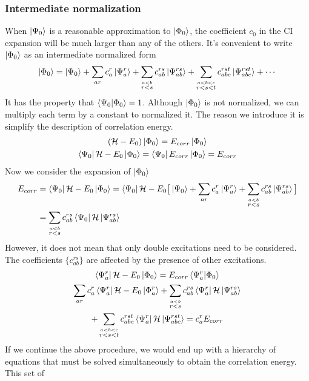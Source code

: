 \documentclass[11pt]{article}
\begin{document}
\subsubsection{Intermediate normalization}
When $\ket{\Psi_0}$ is a reasonable approximation to $\ket{\Phi_0}$, the coefficient $c_0$ in the CI expansion will be much larger than any of
the others. It's convenient to write $\ket{\Phi_0}$ as an intermediate normalized form
\begin{equation}
    \ket{\Phi_0}=\ket{\Psi_0}+\sum_{ar}c_a^r\ket{\Psi_a^r}+\sum_{\stackrel{a<b}{r<s}}c_{ab}^{rs}\ket{\Psi_{ab}^{rs}}+\sum_{\stackrel{a<b<c}{r<s<t}}c_{abc}^{rst}\ket{\Psi_{abc}^{rst}}+\cdots
\end{equation}
It has the property that $\braket{\Psi_0|\Phi_0}=1$. Although $\ket{\Phi_0}$ is not normalized, we can multiply each term by a constant to normalized it. The reason we introduce it is simplify
the description of correlation energy.
\begin{gather}
    (\mathcal{H}-E_0)\ket{\Phi_0}=E_{corr}\ket{\Phi_0} \notag\\
    \bra{\Psi_0}\mathcal{H}-E_0\ket{\Phi_0}=\bra{\Psi_0}E_{corr}\ket{\Phi_0}=E_{corr}
\end{gather}
Now we consider the expansion of $\ket{\Phi_0}$
\begin{equation}
    \begin{split}
        E_{corr}&=\bra{\Psi_0}\mathcal{H}-E_0\ket{\Phi_0}=\bra{\Psi_0}\mathcal{H}-E_0\big[\ket{\Psi_0}+\sum_{ar}c_a^r\ket{\Psi_a^r}+\sum_{\stackrel{a<b}{r<s}}c_{ab}^{rs}\ket{\Psi_{ab}^{rs}}\big]\\
        &=\sum_{\stackrel{a<b}{r<s}}c_{ab}^{rs}\bra{\Psi_0}\mathcal{H}\ket{\Psi_{ab}^{rs}}
    \end{split}
\end{equation}
However, it does not mean that only double excitations need to be considered. The coefficients $\{c_{ab}^{rs}\}$ are affected by the presence of other excitations.
\begin{gather}
    \bra{\Psi_a^r}\mathcal{H}-E_0\ket{\Phi_0}=E_{corr}\braket{\Psi_a^r|\Phi_0}\notag\\
    \sum_{ar}c_a^r\bra{\Psi_a^r}\mathcal{H}-E_0\ket{\Phi_a^r}+\sum_{\stackrel{a<b}{r<s}}c_{ab}^{rs}\bra{\Psi_a^r}\mathcal{H}\ket{\Psi_{ab}^{rs}}\notag\\
    +\sum_{\stackrel{a<b<c}{r<s<t}}c_{abc}^{rst}\bra{\Psi_a^r}\mathcal{H}\ket{\Psi_{abc}^{rst}}=c_a^r E_{corr}
\end{gather}
If we continue the above procedure, we would end up with a hierarchy of equations that must be solved simultaneously to obtain the correlation energy. This set of
\end{document}
